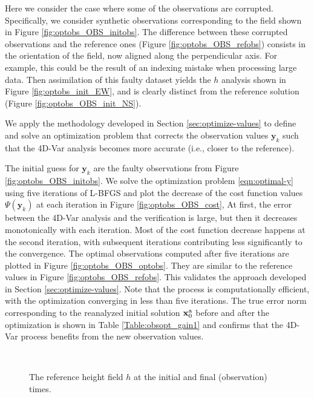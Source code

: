 \documentclass{article}
\newcommand{\xa}{ \mathbf{x}^{\rm a} }
\newcommand{\y}{ \mathbf{y} }
\begin{document}
Here we consider the case where some of the observations 
are corrupted. Specifically, we consider synthetic observations corresponding to the field
shown in Figure \ref{fig:optobs_OBS_initobs}. The difference between these corrupted
observations and the reference ones (Figure \ref{fig:optobs_OBS_refobs})
 consists in the orientation of the field, now aligned along the perpendicular axis. 
For example, this could be the result of an indexing mistake when processing large data.
Then assimilation of this faulty dataset yields the $h$ analysis shown in Figure \ref{fig:optobs_init_EW}, 
and is clearly distinct from the reference solution (Figure \ref{fig:optobs_OBS_init_NS}).

We apply the methodology developed in Section \ref{sec:optimize-values} to define and solve an 
optimization problem that corrects the observation values $\y_k$ such that the 4D-Var analysis becomes 
more accurate (i.e., closer to the reference).

The initial guess for $\y_k$ are the faulty observations from Figure \ref{fig:optobs_OBS_initobs}.
We solve the optimization problem \eqref{eqn:optimal-y} using five iterations of L-BFGS \cite{zhu1997algorithm} 
and plot the decrease of the cost function values $\Psi(\y_k)$ at each iteration in Figure \ref{fig:optobs_OBS_cost},
At first, the error between the 4D-Var analysis and the verification is large,
but then it decreases monotonically with each iteration.
Most of the cost function decrease happens at the second iteration,
with subsequent iterations contributing less significantly to the convergence.
The optimal observations computed after five iterations are plotted in Figure \ref{fig:optobs_OBS_optobs}.
They are similar to the reference values in Figure \ref{fig:optobs_OBS_refobs}. This validates the approach developed
in Section \ref{sec:optimize-values}. Note that the process is computationally efficient, with the optimization
converging in less than five iterations.
The true error norm corresponding to the reanalyzed initial solution $\xa_0$ before and after the optimization 
is shown in Table \ref{Table:obsopt_gain1} and confirms that the 4D-Var process benefits from the new observation values.

\begin{figure}
\setcounter{subfigure}{0}
\centering
  \\
 \caption{The reference height field $h$ at the initial and final (observation) times.}
\end{figure}
\end{document}
